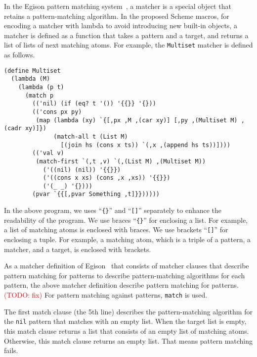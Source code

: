 \documentclass[acmlarge]{acmart}
\newcommand{\todo}[1]{\textcolor{red}{(TODO: #1)}}
\begin{document}
In the Egison pattern matching system~\cite{egi2018aplas}, a matcher is a special object that retains a pattern-matching algorithm.
In the proposed Scheme macros, for encoding a matcher with lambda to avoid introducing new built-in objects, a matcher is defined as a function that takes a pattern and a target, and returns a list of lists of next matching atoms.
For example, the \texttt{Multiset} matcher is defined as follows.

\begin{lstlisting}[language=egison]
(define Multiset
  (lambda (M)
    (lambda (p t)
      (match p
        (('nil) (if (eq? t '()) '{{}} '{}))
        (('cons px py)
         (map (lambda (xy) `{[,px ,M ,(car xy)] [,py ,(Multiset M) ,(cadr xy)]})
              (match-all t (List M)
                [(join hs (cons x ts)) `(,x ,(append hs ts))])))
        (('val v)
         (match-first `(,t ,v) `(,(List M) ,(Multiset M))
           ('((nil) (nil)) '{{}})
           ('((cons x xs) (cons ,x ,xs)) '{{}})
           ('(_ _) '{})))
        (pvar `{{[,pvar Something ,t]}})))))
\end{lstlisting}

In the above program, we uses ``\texttt{\{\}}'' and ``\texttt{[]}'' separately to enhance the readability of the program.
We use braces ``\texttt{\{\}}'' for enclosing a list.
For example, a list of matching atoms is enclosed with braces.
We use brackets ``\texttt{[]}'' for enclosing a tuple.
For example, a matching atom, which is a triple of a pattern, a matcher, and a target, is enclosed with brackets.

As a matcher definition of Egison~\cite{egi2018aplas} that consists of matcher clauses that describe pattern matching for patterns to describe pattern-matching algorithms for each pattern, the above matcher definition describe pattern matching for patterns.\todo{fix}
For pattern matching against patterns, \texttt{match} is used.

The first match clause (the 5th line) describes the pattern-matching algorithm for the \texttt{nil} pattern that matches with an empty list.
When the target list is empty, this match clause returns a list that consists of an empty list of matching atoms.
Otherwise, this match clause returns an empty list.
That means pattern matching fails.
\end{document}
